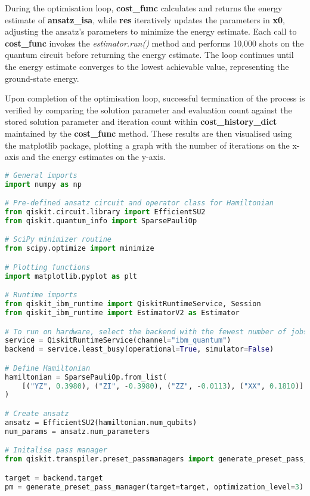 \documentclass{article}
\begin{document}
{During the optimisation loop, \textbf{cost\_func} calculates and returns the energy estimate of \textbf{ansatz\_isa}, while \textbf{res} iteratively updates the parameters in \textbf{x0}, adjusting the ansatz's parameters to minimize the energy estimate. Each call to \textbf{cost\_func} invokes the \textit{estimator.run()} method and performs 10,000 shots on the quantum circuit before returning the energy estimate. The loop continues until the energy estimate converges to the lowest achievable value, representing the ground-state energy.

Upon completion of the optimisation loop, successful termination of the process is verified by comparing the solution parameter and evaluation count against the stored solution parameter and iteration count within \textbf{cost\_history\_dict} maintained by the \textbf{cost\_func} method. These results are then visualised using the matplotlib package, plotting a graph with the number of iterations on the x-axis and the energy estimates on the y-axis.

\begin{lstlisting}[language=Python]
# General imports
import numpy as np

# Pre-defined ansatz circuit and operator class for Hamiltonian
from qiskit.circuit.library import EfficientSU2
from qiskit.quantum_info import SparsePauliOp

# SciPy minimizer routine
from scipy.optimize import minimize

# Plotting functions
import matplotlib.pyplot as plt

# Runtime imports
from qiskit_ibm_runtime import QiskitRuntimeService, Session
from qiskit_ibm_runtime import EstimatorV2 as Estimator

# To run on hardware, select the backend with the fewest number of jobs in the queue
service = QiskitRuntimeService(channel="ibm_quantum")
backend = service.least_busy(operational=True, simulator=False)

# Define Hamiltonian
hamiltonian = SparsePauliOp.from_list(
    [("YZ", 0.3980), ("ZI", -0.3980), ("ZZ", -0.0113), ("XX", 0.1810)]
)

# Create ansatz
ansatz = EfficientSU2(hamiltonian.num_qubits)
num_params = ansatz.num_parameters

# Initalise pass manager
from qiskit.transpiler.preset_passmanagers import generate_preset_pass_manager

target = backend.target
pm = generate_preset_pass_manager(target=target, optimization_level=3)


\end{lstlisting}}
\end{document}
